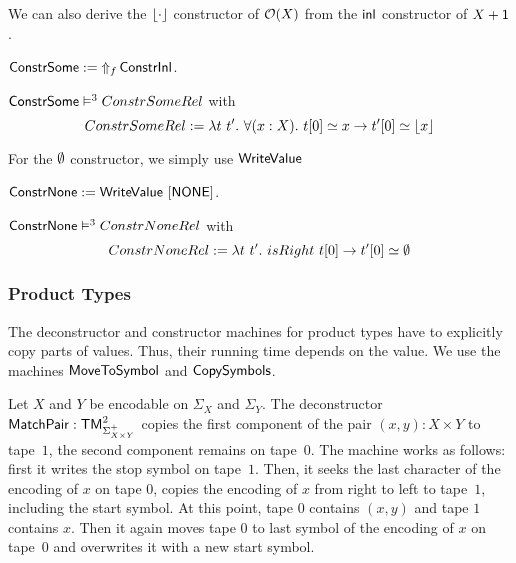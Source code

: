 We can also derive the $\Some{\cdot}$ constructor of $\Option(X)$ from the $\inl$ constructor of $X+\Unit$.
\begin{definition}
  \label{def:Constr_Some}
  $\MS{ConstrSome} := \LiftAlphabet{\MS{ConstrInl}}{f}$.
\end{definition}
\begin{lemma}
  \label{lem:Constr_Some_Sem}
  $\MS{ConstrSome} \RealiseIn{3} ConstrSomeRel$ with
  \[
    ConstrSomeRel := \lambda t~t'.~\forall(x:X).~t[0] \simeq x \rightarrow t'[0] \simeq \Some{x}
  \]
\end{lemma}
For the $\None$ constructor, we simply use $\MS{WriteValue}$
\begin{definition}
  \label{def:Constr_None}
  $\MS{ConstrNone} := \MS{WriteValue}~[\MS{NONE}]$.
\end{definition}
\begin{lemma}
  \label{lem:Constr_None_Sem}
  $\MS{ConstrNone} \RealiseIn{3} ConstrNoneRel$ with
  \[
    ConstrNoneRel := \lambda t~t'.~isRight~t[0] \rightarrow t'[0] \simeq \None
  \]
\end{lemma}


\subsubsection{Product Types}
\label{sec:MatchPair}

The deconstructor and constructor machines for product types have to explicitly copy parts of values.  Thus, their running time depends on the value.  We
use the machines $\MS{MoveToSymbol}$ and $\MS{CopySymbols}$.

Let $X$ and $Y$ be encodable on $\Sigma_X$ and $\Sigma_Y$.  The deconstructor $\MS{MatchPair} : \TM_{\Sigma_{X \times Y}^+}^2$ copies the first
component of the pair $(x,y):X \times Y$ to tape~$1$, the second component remains on tape~$0$.  The machine works as follows: first it writes the
stop symbol on tape~$1$.  Then, it seeks the last character of the encoding of $x$ on tape $0$, copies the encoding of $x$ from right to left to
tape~$1$, including the start symbol.  At this point, tape $0$ contains $(x,y)$ and tape $1$ contains $x$.  Then it again moves tape $0$ to last
symbol of the encoding of $x$ on tape~$0$ and overwrites it with a new start symbol.

